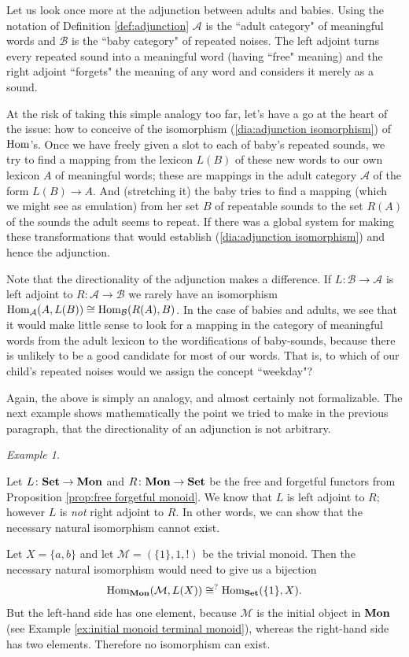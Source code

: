 \documentclass{book}
\def\tn{\textnormal}
\def\mc{\mathcal}
\def\Hom{\tn{Hom}}
\def\to{\rightarrow}
\def\taking{\colon}
\def\iso{\cong}
\def\Mon{{\bf Mon}}
\def\Set{{\bf Set}}
\def\mcA{\mc{A}}
\def\mcB{\mc{B}}
\def\mcM{\mc{M}}
\theoremstyle{remark}
\newtheorem{example}[subsubsection]{Example}
\theoremstyle{definition}
\begin{document}
Let us look once more at the adjunction between adults and babies. Using the notation of Definition \ref{def:adjunction} $\mcA$ is the ``adult category" of meaningful words and $\mcB$ is the ``baby category" of repeated noises. The left adjoint turns every repeated sound into a meaningful word (having ``free" meaning) and the right adjoint ``forgets" the meaning of any word and considers it merely as a sound. 

At the risk of taking this simple analogy too far, let's have a go at the heart of the issue: how to conceive of the isomorphism (\ref{dia:adjunction isomorphism}) of $\Hom$'s. Once we have freely given a slot to each of baby's repeated sounds, we try to find a mapping from the lexicon $L(B)$ of these new words to our own lexicon $A$ of meaningful words; these are mappings in the adult category $\mcA$ of the form $L(B)\to A.$ And (stretching it) the baby tries to find a mapping (which we might see as emulation) from her set $B$ of repeatable sounds to the set $R(A)$ of the sounds the adult seems to repeat. If there was a global system for making these transformations that would establish  (\ref{dia:adjunction isomorphism}) and hence the adjunction.

Note that the directionality of the adjunction makes a difference. If $L\taking\mcB\to\mcA$ is left adjoint to $R\taking\mcA\to\mcB$ we rarely have an isomorphism $\Hom_\mcA(A,L(B))\iso\Hom_\mcB(R(A),B)$. In the case of babies and adults, we see that it would make little sense to look for a mapping in the category of meaningful words from the adult lexicon to the wordifications of baby-sounds, because there is unlikely to be a good candidate for most of our words. That is, to which of our child's repeated noises would we assign the concept ``weekday"? 

Again, the above is simply an analogy, and almost certainly not formalizable. The next example shows mathematically the point we tried to make in the previous paragraph, that the directionality of an adjunction is not arbitrary.

\begin{example}\label{ex:adjunction monoids and sets}

Let $L\taking\Set\to\Mon$ and $R\taking\Mon\to\Set$ be the free and forgetful functors from Proposition \ref{prop:free forgetful monoid}. We know that $L$ is left adjoint to $R$; however $L$ is {\em not} right adjoint to $R$. In other words, we can show that the necessary natural isomorphism cannot exist.

Let $X=\{a,b\}$ and let $\mcM=(\{1\},1,!)$ be the trivial monoid. Then the necessary natural isomorphism would need to give us a bijection 
$$\Hom_\Mon(\mcM,L(X))\iso^?\Hom_\Set(\{1\},X).$$ 
But the left-hand side has one element, because $\mcM$ is the initial object in $\Mon$ (see Example \ref{ex:initial monoid terminal monoid}), whereas the right-hand side has two elements. Therefore no isomorphism can exist.

\end{example}
\end{document}
